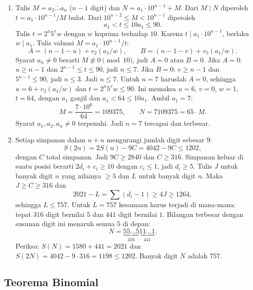 \documentclass[12pt]{scrartcl}
\begin{document}
\begin{enumerate}[resume]
	\item Tulis $M = \overline{a_2\dots a_n}$ ($n - 1$ digit) dan
	$N = a_1 \cdot 10^{n-1} + M$.
	Dari $M \mid N$ diperoleh $t = a_1 \cdot 10^{n-1}/M$ bulat.
	Dari $10^{n-2} \le M < 10^{n-1}$ diperoleh
	\[ a_1 < t \le 10a_1 \le 90. \]
	Tulis $t = 2^u5^vw$ dengan $w$ koprima terhadap $10$.
	Karena $t \mid a_1 \cdot 10^{n-1}$, berlaku $w \mid a_1$.
	Tulis valuasi $M = a_1 \cdot 10^{n-1}/t$:
	\[ A = (n - 1 - u) + v_2(a_1/w), \qquad B = (n - 1 - v) + v_5(a_1/w). \]
	Syarat $a_n \ne 0$ berarti $M \not\equiv 0 \pmod{10}$,
	jadi $A = 0$ atau $B = 0$.
	Jika $A = 0$: $u \ge n - 1$ dan $2^{n-1} \le t \le 90$, jadi $n \le 7$.
	Jika $B = 0$: $v \ge n - 1$ dan $5^{n-1} \le 90$, jadi $n \le 3$.
	Jadi $n \le 7$.
	Untuk $n = 7$ haruslah $A = 0$,
	sehingga $u = 6 + v_2(a_1/w)$ dan $t = 2^u5^vw \le 90$.
	Ini memaksa $u = 6$, $v = 0$, $w = 1$, $t = 64$,
	dengan $a_1$ ganjil dan $a_1 < 64 \le 10a_1$.
	Ambil $a_1 = 7$:
	\[ M = \frac{7 \cdot 10^6}{64} = 109375, \qquad N = 7109375 = 65 \cdot M. \]
	Syarat $a_1, a_2, a_n \ne 0$ terpenuhi.
	Jadi $n = 7$ tercapai dan terbesar.

	\item Setiap simpanan dalam $n + n$ mengurangi jumlah digit sebesar $9$:
	\[ S(2n) = 2S(n) - 9C = 4042 - 9C \le 1202, \]
	dengan $C$ total simpanan. Jadi $9C \ge 2840$ dan $C \ge 316$.
	Simpanan keluar di suatu posisi berarti $2d_i + c_i \ge 10$
	dengan $c_i \le 1$, jadi $d_i \ge 5$.
	Tulis $J$ untuk banyak digit $n$ yang nilainya $\ge 5$ dan $L$ untuk banyak digit $n$.
	Maka $J \ge C \ge 316$ dan
	\[ 2021 - L = \sum (d_i - 1) \ge 4J \ge 1264, \]
	sehingga $L \le 757$.
	Untuk $L = 757$ kesamaan harus terjadi di mana-mana:
	tepat $316$ digit bernilai $5$ dan $441$ digit bernilai $1$.
	Bilangan terbesar dengan susunan digit ini menaruh semua $5$ di depan:
	\[ N = \underbrace{55\dots5}_{316}\underbrace{11\dots1}_{441}. \]
	Periksa: $S(N) = 1580 + 441 = 2021$ dan $S(2N) = 4042 - 9 \cdot 316 = 1198 \le 1202$.
	Banyak digit $N$ adalah $757$.
\end{enumerate}

\subsection{Teorema Binomial}
\end{document}
